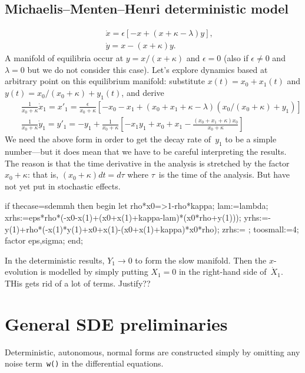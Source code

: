 \documentclass[11pt,a5paper]{article}
\begin{document}
\subsection{Michaelis--Menten--Henri deterministic model}

\begin{eqnarray*}
&&\dot x=\epsilon[-x+(x+\kappa-\lambda)y],
\\&&\dot y=x-(x+\kappa)y.
\end{eqnarray*}
A manifold of equilibria occur at \(y=x/(x+\kappa)\) and \(\epsilon=0\)  (also if \(\epsilon\neq 0\) and \(\lambda=0\) but we do not consider this case).
Let's explore dynamics based at arbitrary point on this equilibrium manifold:
substitute \(x(t)=x_0+x_1(t)\) and \(y(t)=x_0/(x_0+\kappa)+y_1(t)\), and derive
\begin{eqnarray*}
&&\frac1{x_0+\kappa}\dot x_1=x'_1=\frac\epsilon{x_0+\kappa}\left[
-x_0-x_1+(x_0+x_1+\kappa-\lambda)(x_0/(x_0+\kappa)+y_1)
\right]
\\&&\frac1{x_0+\kappa}\dot y_1=y'_1=-y_1+\frac1{x_0+\kappa}\left[
-x_1y_1+x_0+x_1-\frac{(x_0+x_1+\kappa)x_0}{x_0+\kappa}\right]
\end{eqnarray*}
We need the above form in order to get the decay rate of~\(y_1\) to be a simple number---but it does mean that we have to be careful interpreting the results.
The reason is that the time derivative in the analysis is stretched by the factor~\(x_0+\kappa\): that is, \((x_0+\kappa)dt=d\tau\) where \(\tau\)~is the time of the analysis.
But have not yet put in stochastic effects.
\begin{reduce}
if thecase=sdemmh then begin
let rho*x0=>1-rho*kappa;
lam:=lambda;
xrhs:={eps*rho*(-x0-x(1)+(x0+x(1)+kappa-lam)*(x0*rho+y(1)))};
yrhs:={-y(1)+rho*(-x(1)*y(1)+x0+x(1)-(x0+x(1)+kappa)*x0*rho)};
zrhs:={ };
toosmall:=4;
factor eps,sigma;
end;
\end{reduce}

In the deterministic results, \(Y_1\to 0\) to form the slow manifold.
Then the \(x\)-evolution is modelled by simply putting \(X_1=0\) in the right-hand side of~\(\dot X_1\).
THis gets rid of a lot of terms.  Justify??





\section{General SDE preliminaries}

Deterministic, autonomous, normal forms are constructed simply by omitting any noise term~\verb|w()| in the differential equations.
\end{document}
